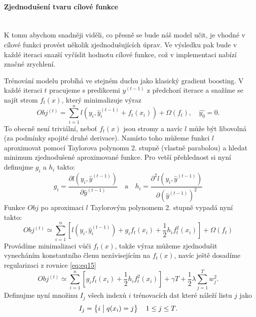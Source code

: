 \documentclass[a4paper]{article}
\begin{document}
\paragraph{Zjednodušení tvaru cílové funkce} \mbox{} \\
K tomu abychom snadněji viděli, co přesně se bude náš model učit, je vhodné v cílové funkci provést několik zjednodušujících úprav. Ve výsledku pak bude v každé iteraci snazší vyčíslit hodnotu cílové funkce, což v implementaci nabízí značné zrychlení. 

Trénování modelu probíhá ve stejném duchu jako klasický gradient boosting. V každé iteraci $t$ pracujeme s predikcemi $y^{(t-1)}$ z předchozí iterace a snažíme se najít strom $f_t(x)$, který minimalizuje výraz
    \begin{equation}
        Obj^{(t)} = \sum\limits_{i=1}^n l(y_i, \hat{y}_i^{(t-1)} + f_t(x_i)) + \Omega(f_t), \quad \hat{y_0} = 0.
    \end{equation}
To obecně není triviální, neboť $f_t(x)$ jsou stromy a navíc $l$ může být libovolná (za podmínky spojité druhé derivace). Namísto toho můžeme funkci $l$ aproximovat pomocí Taylorova polynomu 2. stupně (vlastně parabolou) a hledat minimum zjednodušené aproximované funkce. Pro vetší přehlednost si nyní definujme $g_i$ a $h_i$ takto:
    \begin{equation}
        g_i = \frac{\partial  l (y_i, \hat{y}^{(t-1)})}{\partial \hat{y}^{(t-1)}} \quad \text{a} \quad
        h_i = \frac{\partial^2  l(y_i, \hat{y}^{(t-1)})}{\partial (\hat{y}^{(t-1)})^2}
    \end{equation}
Funkce $Obj$ po aproximaci $l$ Taylorovým polynomem 2. stupně vypadá nyní takto:
    \begin{equation}
        Obj^{(t)} \simeq \sum\limits_{i=1}^n \left[ l(y_i, \hat{y}_i^{(t-1)}) + g_i f_t(x_i) + \frac{1}{2} h_i f_t^2(x_i) \right] + \Omega(f_t)
    \end{equation}
Provádíme minimalizaci vůči $f_t(x)$, takže výraz můžeme zjednodušit vynecháním konstantního členu nezávisejícím na $f_t(x)$, navíc ještě dosadíme regularizaci z rovnice \eqref{eq:eq15}
    \begin{equation}\label{eq:eq20}
        Obj^{(t)} \simeq \sum\limits_{i=1}^n \left [g_i f_t(x_i) + \frac{1}{2} h_i f_t^2(x_i) \right] + \gamma T + \frac{1}{2} \lambda \sum \limits_{j=1}^T w_j^2.
    \end{equation}
Definujme nyní množinu $I_j$ všech indexů $i$ trénovacích dat které náleží listu $j$ jako
    \begin{equation}
        I_j = \left \{i \bigm | q(x_i) = j \right \} \quad 1 \leq j \leq T.
    \end{equation}
\end{document}
